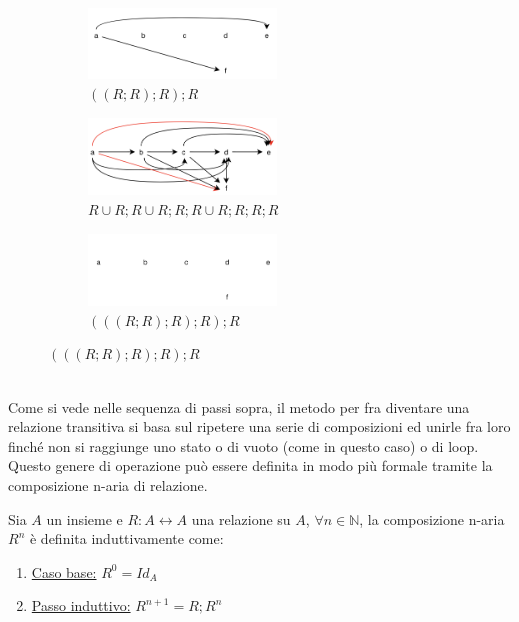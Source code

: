 \begin{figure}[h!]
\begin{subfigure}{.3\textwidth}
    \end{subfigure}
    \hfill
    \begin{subfigure}{.3\textwidth}
        \vspace{15pt}
        \centering
        \includegraphics[width=5cm]{images/chiusura-transitiva-6.png}
        \caption{$((R;R);R);R$}
    \end{subfigure}
    \hfill
    \begin{subfigure}{.3\textwidth}
        \vspace{15pt}
        \centering
        \includegraphics[width=5cm]{images/chiusura-transitiva-7.png}
        \caption{$R \cup R;R \cup R;R;R \cup R;R;R;R$}
    \end{subfigure}
    \hspace{2cm}
    \begin{subfigure}{.3\textwidth}
        \vspace{15pt}
        \centering
        \includegraphics[width=5cm]{images/chiusura-transitiva-8.png}
        \caption{$(((R;R);R);R);R$}
    \end{subfigure}
\end{figure}
\\
Come si vede nelle sequenza di passi sopra, il metodo per fra diventare una relazione transitiva si basa sul ripetere una serie di composizioni ed unirle fra loro finché non si raggiunge uno stato o di vuoto (come in questo caso) o di loop. Questo genere di operazione può essere definita in modo più formale tramite la composizione n-aria di relazione.
\begin{definition}
    Sia $A$ un insieme e $R: A \leftrightarrow A$ una relazione su $A$, $\forall n \in \mathbb{N}$, la composizione n-aria $R^n$ è definita induttivamente come:
    \begin{enumerate}
        \item \underline{Caso base:} $R^0 = Id_A$
        \item \underline{Passo induttivo:} $R^{n+1} = R;R^n$
    \end{enumerate}
\end{definition}
